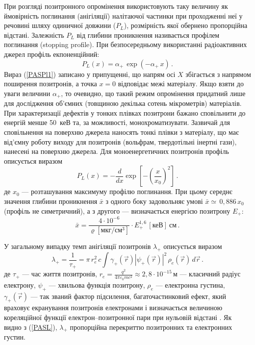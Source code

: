 При розгляді позитронного опромінення використовують
таку величину як ймовірність поглинання (анігіляції) налітаючої частинки
при проходженні неї у речовині шляху одиничної довжини ($P_L$),
розмірність якої обернено пропорційна відстані.
Залежність $P_L$ від глибини проникнення називається профілем поглинання (stopping profile).
При безпосередньому використанні радіоактивних джерел профіль екпоненційний:
\begin{equation}\label{PASPl1}
P_L(x)=\alpha_+\,\exp(-\alpha_+\,x)\,.
\end{equation}
Вираз (\ref{PASPl1}) записано у припущенні, що
напрям осі $X$ збігається з напрямом поширення позитронів,
а точка $x=0$ відповідає межі матеріалу.
Якщо взяти до уваги величини $\alpha_+$, то очевидно,
що такий режим опромінення придатний лише для дослідження об'ємних
(товщиною декілька сотень мікрометрів) матеріалів.
При характеризації дефектів у тонких плівках позитрони
бажано сповільнити до енергій менше 50~кеВ та, за можливості, монохроматизувати.
Зазвичай для сповільнення на поверхню джерела наносять тонкі плівки з матеріалу, що має
від'ємну роботу виходу для позитронів (вольфрам, твердотільні інертні гази), нанесені на поверхню джерела.
Для моноенергетичних позитронів профіль описується виразом
\begin{equation}\label{PASPl2}
P_L(x)=-\frac{d}{dx}\exp\left[-\left(\frac{x}{x_0}\right)^2\right]\,.
\end{equation}
де
$x_0$ --- розташування максимуму профілю поглинання.
При цьому середнє значення глибини проникнення $\bar{x}$  з одного боку
задовольняє умові $\bar{x}\simeq \,0,886\, x_0$ (профіль не симетричний),
а з другого --- визначається енергією позитрону $E_{+}$:
\begin{equation}
\bar{x}=\frac{4\cdot10^{-6}}{\varrho\left[\text{мкг}/\text{см}^3\right]}\cdot E_{+}^{1,6}\,[\text{кеВ}]\:\text{см}\,.
\end{equation}

У загальному випадку темп анігіляції позитронів $\lambda_+$ описується виразом
\begin{equation}\label{PASL}
\lambda_+=\frac{1}{\tau_+}=\pi\,r_e^2\,c\int\gamma_+(\overrightarrow{r})\left|\psi_+(\overrightarrow{r})\right|^2\,\rho_e(\overrightarrow{r})\,d\overrightarrow{r}\,.
\end{equation}
де
$\tau_+$ --- час життя позитронів,
$r_e=\frac{q^2}{4\pi\varepsilon_0 m c^2}\approx2,8\cdot10^{-15}\,\text{м}$ --- класичний радіус електрону,
$\psi_+$ --- хвильова функція позитрону,
$\rho_e$ --- електронна густина,
$\gamma_+(\overrightarrow{r})$ --- так званий фактор підсилення, багаточастинковий ефект,
який враховує екранування позитронів електронами і визначається величиною
кореляційної функції електрон--позитронної пари при нульовій відстані \cite{tuomisto2019}.
Як видно з (\ref{PASL}), $\lambda_+$ пропорційна перекриттю позитронних та електронних густин.

